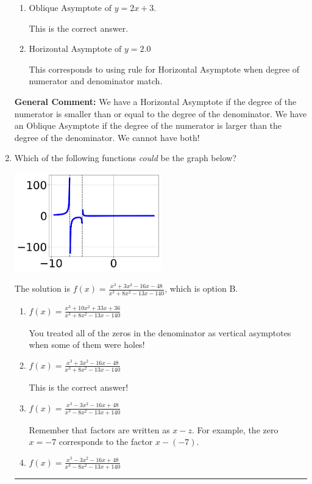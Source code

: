 \documentclass{extbook}[14pt]
\newcommand{\litem}[1]{\item #1

\rule{\textwidth}{0.4pt}}
\begin{document}
\begin{enumerate}
{\begin{enumerate}[label=\Alph*.]
This corresponds to believing there can be both a horizontal and oblique asymptote.
\item \( \text{Oblique Asymptote of } y = 2x + 3. \)

This is the correct answer.
\item \( \text{Horizontal Asymptote of } y = 2.0  \)

This corresponds to using rule for Horizontal Asymptote when degree of numerator and denominator match.
\end{enumerate}

\textbf{General Comment:} We have a Horizontal Asymptote if the degree of the numerator is smaller than or equal to the degree of the denominator. We have an Oblique Asymptote if the degree of the numerator is larger than the degree of the denominator. We cannot have both!
}
\litem{
Which of the following functions \textit{could} be the graph below?

\begin{center}
    \includegraphics[width=0.5\textwidth]{../Figures/identifyGraphOfRationalFunctionB.png}
\end{center}




The solution is \( f(x)=\frac{x^{3} +3 x^{2} -16 x -48}{x^{3} +8 x^{2} -13 x -140} \), which is option B.\begin{enumerate}[label=\Alph*.]
\item \( f(x)=\frac{x^{3} +10 x^{2} +33 x + 36}{x^{3} +8 x^{2} -13 x -140} \)

You treated all of the zeros in the denominator as vertical asymptotes when some of them were holes!
\item \( f(x)=\frac{x^{3} +3 x^{2} -16 x -48}{x^{3} +8 x^{2} -13 x -140} \)

This is the correct answer!
\item \( f(x)=\frac{x^{3} -3 x^{2} -16 x + 48}{x^{3} -8 x^{2} -13 x + 140} \)

Remember that factors are written as $x-z$. For example, the zero $x=-7$ corresponds to the factor $x-(-7)$.
\item \( f(x)=\frac{x^{3} -3 x^{2} -16 x + 48}{x^{3} -8 x^{2} -13 x + 140} \)


\end{enumerate}}
\end{enumerate}
\end{document}
